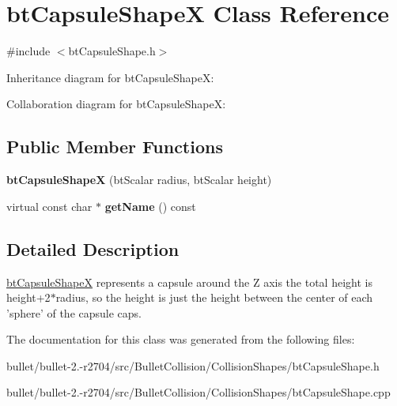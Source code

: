 \hypertarget{classbt_capsule_shape_x}{\section{bt\+Capsule\+Shape\+X Class Reference}
\label{classbt_capsule_shape_x}
}


{\ttfamily \#include $<$bt\+Capsule\+Shape.\+h$>$}



Inheritance diagram for bt\+Capsule\+Shape\+X\+:


Collaboration diagram for bt\+Capsule\+Shape\+X\+:
\subsection*{Public Member Functions}
\begin{DoxyCompactItemize}
\item 
\hypertarget{classbt_capsule_shape_x_ad9933edc948f83013b31607456f61db6}{{\bfseries bt\+Capsule\+Shape\+X} (bt\+Scalar radius, bt\+Scalar height)}\label{classbt_capsule_shape_x_ad9933edc948f83013b31607456f61db6}

\item 
\hypertarget{classbt_capsule_shape_x_ada6275d2248861bfe6928b22fce79c3a}{virtual const char $\ast$ {\bfseries get\+Name} () const }\label{classbt_capsule_shape_x_ada6275d2248861bfe6928b22fce79c3a}

\end{DoxyCompactItemize}


\subsection{Detailed Description}
\hyperlink{classbt_capsule_shape_x}{bt\+Capsule\+Shape\+X} represents a capsule around the Z axis the total height is height+2$\ast$radius, so the height is just the height between the center of each 'sphere' of the capsule caps. 

The documentation for this class was generated from the following files\+:\begin{DoxyCompactItemize}
\item 
bullet/bullet-\/2.-\/r2704/src/\+Bullet\+Collision/\+Collision\+Shapes/bt\+Capsule\+Shape.\+h\item 
bullet/bullet-\/2.-\/r2704/src/\+Bullet\+Collision/\+Collision\+Shapes/bt\+Capsule\+Shape.\+cpp\end{DoxyCompactItemize}
